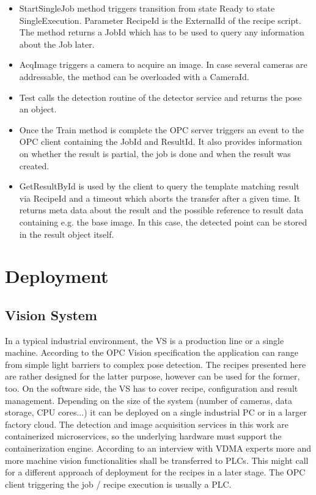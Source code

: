 \begin{itemize}
\begin{itemize}
    	\item StartSingleJob method triggers transition from state Ready to state SingleExecution. Parameter RecipeId is the ExternalId of the recipe script. The method returns a JobId which has to be used to query any information about the Job later.
    	\item AcqImage triggers a camera to acquire an image. In case several cameras are addressable, the method can be overloaded with a CameraId.
    	\item Test calls the detection routine of the detector service and returns the pose an object.
    	\item Once the Train method is complete the OPC server triggers an event to the OPC client containing the JobId and ResultId. It also provides information on whether the result is partial, the job is done and when the result was created.
    	\item GetResultById is used by the client to query the template matching result via RecipeId and a timeout which aborts the transfer after a given time. It returns meta data about the result and the possible reference to result data containing e.g. the base image. In this case, the detected point can be stored in the result object itself.
    \end{itemize}
\end{itemize}

\section{Deployment}
\subsection{Vision System}
In a typical industrial environment, the VS is a production line or a single machine. According to the OPC Vision specification the application can range from simple light barriers to complex pose detection. The recipes presented here are rather designed for the latter purpose, however can be used for the former, too. On the software side, the VS has to cover recipe, configuration and result management. Depending on the size of the system (number of cameras, data storage, CPU cores...) it can be deployed on a single industrial PC or in a larger factory cloud. The detection and image acquisition services in this work are containerized microservices, so the underlying hardware must support the containerization engine. According to an interview with VDMA experts \cite{Lastvisited26-04-20192015OPCVision} more and more machine vision functionalities shall be transferred to PLCs. This might call for a different approach of deployment for the recipes in a later stage. The OPC client triggering the job / recipe execution is usually a PLC.

